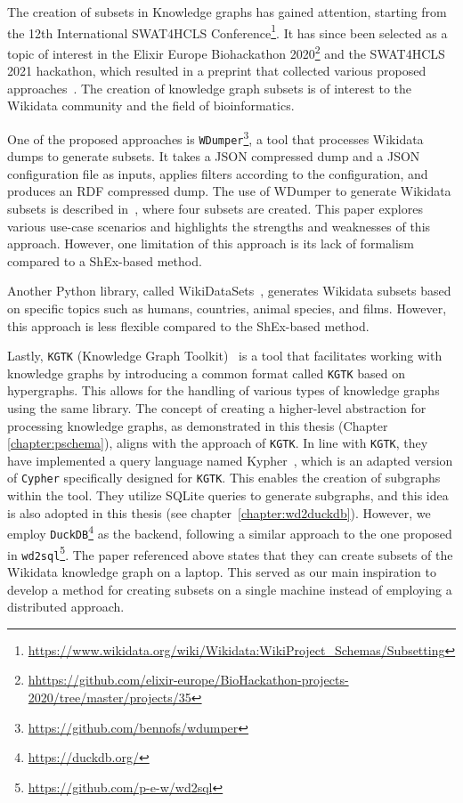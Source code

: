 The creation of subsets in Knowledge graphs has gained attention, starting from the 12th International SWAT4HCLS Conference\footnote{\url{https://www.wikidata.org/wiki/Wikidata:WikiProject_Schemas/Subsetting}}. It has since been selected as a topic of interest in the Elixir Europe Biohackathon 2020\footnote{\url{hhttps://github.com/elixir-europe/BioHackathon-projects-2020/tree/master/projects/35}} and the SWAT4HCLS 2021 hackathon, which resulted in a preprint that collected various proposed approaches~\cite{10.37044/osf.io/wu9et}. The creation of knowledge graph subsets is of interest to the Wikidata community and the field of bioinformatics.

One of the proposed approaches is \texttt{WDumper}\footnote{\url{https://github.com/bennofs/wdumper}}, a tool that processes Wikidata dumps to generate subsets. It takes a JSON compressed dump and a JSON configuration file as inputs, applies filters according to the configuration, and produces an RDF compressed dump. The use of WDumper to generate Wikidata subsets is described in~\cite{wdumper}, where four subsets are created. This paper explores various use-case scenarios and highlights the strengths and weaknesses of this approach. However, one limitation of this approach is its lack of formalism compared to a ShEx-based method.

Another Python library, called WikiDataSets~\cite{boschin2019wikidatasets}, generates Wikidata subsets based on specific topics such as humans, countries, animal species, and films. However, this approach is less flexible compared to the ShEx-based method.

Lastly, \texttt{KGTK} (Knowledge Graph Toolkit)~\cite{ilievski2021kgtk} is a tool that facilitates working with knowledge graphs by introducing a common format called \texttt{KGTK} based on hypergraphs. This allows for the handling of various types of knowledge graphs using the same library. The concept of creating a higher-level abstraction for processing knowledge graphs, as demonstrated in this thesis (Chapter \ref{chapter:pschema}), aligns with the approach of \texttt{KGTK}. In line with \texttt{KGTK}, they have implemented a query language named Kypher~\cite{chalupsky2021creating}, which is an adapted version of \texttt{Cypher} specifically designed for \texttt{KGTK}. This enables the creation of subgraphs within the tool. They utilize SQLite queries to generate subgraphs, and this idea is also adopted in this thesis (see chapter~\ref{chapter:wd2duckdb}). However, we employ \texttt{DuckDB}\footnote{\url{https://duckdb.org/}} as the backend, following a similar approach to the one proposed in \texttt{wd2sql}\footnote{\url{https://github.com/p-e-w/wd2sql}}. The paper referenced above states that they can create subsets of the Wikidata knowledge graph on a laptop. This served as our main inspiration to develop a method for creating subsets on a single machine instead of employing a distributed approach.

